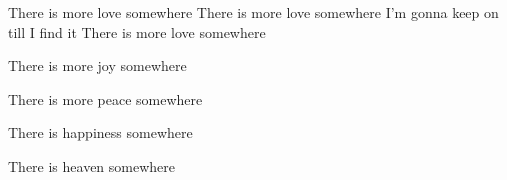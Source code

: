 
\contd
{}

\versemark
There is more love somewhere
There is more love somewhere
I’m gonna keep on till I find it
There is more love somewhere

\versemark
There is more joy somewhere\simile

\versemark
There is more peace somewhere\simile

\versemark
There is happiness somewhere\simile

\versemark
There is heaven somewhere\simile\repeatfirst

